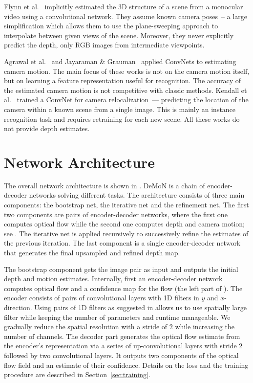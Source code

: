 \documentclass[10pt,twocolumn,letterpaper]{article}
\begin{document}
Flynn et al.~\cite{flynn_deepstereo_2015} implicitly estimated the 3D structure of a scene from a monocular video using a convolutional network.
They assume known camera poses~-- a large simplification which allows them to use the plane-sweeping approach to interpolate between given views of the scene.
Moreover, they never explicitly predict the depth, only RGB images from intermediate viewpoints.

Agrawal et al.~\cite{agrawal_egomotion_2015} and Jayaraman \& Grauman~\cite{Jayaraman2015egomotion} applied ConvNets to estimating camera motion. The main focus of these works is not on the camera motion itself, but on learning a feature representation useful for recognition. The accuracy of the estimated camera motion is not competitive with classic methods. 
Kendall et al.~\cite{kendall_modelling_2015} trained a ConvNet for camera relocalization~--- predicting the location of the camera within a known scene from a single image.
This is mainly an instance recognition task and requires retraining for each new scene. 
All these works do not provide depth estimates. 


\section{Network Architecture}

The overall network architecture is shown in .
\mbox{DeMoN} is a chain of encoder-decoder networks solving different tasks. 
The architecture consists of three main components: the bootstrap net, the iterative net and the refinement net. 
The first two components are pairs of encoder-decoder networks, where the first one computes optical flow while the second one computes depth and camera motion; see . The iterative net is applied 
recursively to successively refine the estimates of the previous iteration. 
The last component is a single encoder-decoder network that generates the final upsampled and refined depth map.%

The bootstrap component gets the image pair as input and outputs the initial depth and motion estimates. 
Internally, first an encoder-decoder network computes optical flow and a confidence map for the flow (the left part of ). 
The encoder consists of pairs of convolutional layers with 1D filters in $y$ and $x$-direction.
Using pairs of 1D filters as suggested in \cite{szegedy_rethinking_2015} allows us to use spatially large filter while keeping the number of parameters and runtime manageable.
We gradually reduce the spatial resolution with a stride of $2$ while increasing the number of channels.
The decoder part generates the optical flow estimate from the encoder's representation via a series of up-convolutional layers with stride $2$ followed by two convolutional layers.
It outputs two components of the optical flow field and an estimate of their confidence.
Details on the loss and the training procedure are described in Section~\ref{sec:training}.
\end{document}
